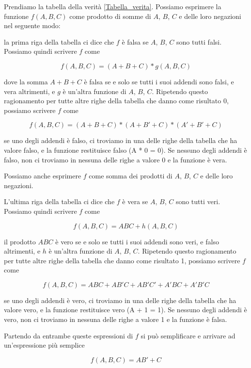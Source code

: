 \documentclass{article}
\begin{document}
\vspace{3mm}

Prendiamo la tabella della verità \ref{Tabella_verita}. Possiamo esprimere la funzione $f(A, B, C)$ come prodotto di somme di $A$, $B$, $C$ e delle loro negazioni nel seguente modo:

la prima riga della tabella ci dice che $f$ è falsa se $A$, $B$, $C$ sono tutti falsi. Possiamo quindi scrivere $f$ come

\[f(A, B, C) = (A + B + C) * g(A, B, C)\]

dove la somma $A + B + C$ è falsa se e solo se tutti i suoi addendi sono falsi, e vera altrimenti, e $g$ è un'altra funzione di $A$, $B$, $C$. Ripetendo questo ragionamento per tutte altre righe della tabella che danno come risultato 0, possiamo scrivere $f$ come

\[f(A, B, C) = (A + B + C) * (A + B' + C) * (A' + B' + C)\]

se uno degli addendi è falso, ci troviamo in una delle righe della tabella che ha valore falso, e la funzione restituisce falso (A * 0 = 0). Se nessuno degli addendi è falso, non ci troviamo in nessuna delle righe a valore 0 e la funzione è vera.

\vspace{3mm}

Possiamo anche esprimere $f$ come somma dei prodotti di $A$, $B$, $C$ e delle loro negazioni.

L'ultima riga della tabella ci dice che $f$ è vera se $A$, $B$, $C$ sono tutti veri. Possiamo quindi scrivere $f$ come

\[f(A, B, C) = ABC + h(A, B, C)\]

il prodotto $ABC$ è vero se e solo se tutti i suoi addendi sono veri, e falso altrimenti, e $h$ è un'altra funzione di $A$, $B$, $C$.  Ripetendo questo ragionamento per tutte altre righe della tabella che danno come risultato 1, possiamo scrivere $f$ come

\[f(A, B, C) = ABC + AB'C + AB'C' + A'BC + A'B'C\]

se uno degli addendi è vero, ci troviamo in una delle righe della tabella che ha valore vero, e la funzione restituisce vero (A + 1 = 1). Se nessuno degli addendi è vero, non ci troviamo in nessuna delle righe a valore 1 e la funzione è falsa.

Partendo da entrambe queste espressioni di $f$ si può semplificare e arrivare ad un'espressione più semplice

\[f(A, B, C) = AB' + C\]
\end{document}
